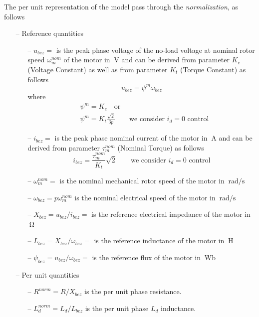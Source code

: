 \documentclass[11pt,a4paper]{article}
\numberwithin{equation}{section}
\theoremstyle{it}
\theoremstyle{definition}
\begin{document}
\begin{onehalfspace}
The per unit representation of the model pass through the \textit{normalization}, as follows
\begin{itemize}
	\item[--] Reference quantities
	\begin{itemize}
		\item[--] $u_{bez} = $ is the peak phase voltage of the no-load voltage at nominal rotor speed $\omega_m^{nom}$ of the motor in $\SI{}{\volt}$ and can be derived from parameter $K_e$ (Voltage Constant) as well as from parameter $K_t$ (Torque Constant) as follows
		\begin{equation}
			u_{bez} = \psi^m\omega_{bez} 
		\end{equation}
	where
		\begin{equation}
			\begin{aligned}
			& \psi^m = K_e\quad \text{or} \\[6pt]
			& \psi^m = K_t\frac{\sqrt{2}}{3p} \qquad\text{we consider $i_d=0$ control}
			\end{aligned}
		\end{equation}
		\item[--] $i_{bez} = $ is the peak phase nominal current of the motor in $\SI{}{\ampere}$ and can be derived from parameter $\tau_m^{nom}$ (Nominal Torque) as follows
		\begin{equation}
			i_{bez} = \frac{\tau_m^{nom}}{K_t}\sqrt{2} \qquad\text{we consider $i_d=0$ control}
		\end{equation}
		\item[--] $\omega_m^{nom} = $ is the nominal mechanical rotor speed of the motor in $\SI{}{\radian\per\second}$
		\item[--] $\omega_{bez} = p \omega_m^{nom}$ is the nominal electrical speed of the motor in $\SI{}{\radian\per\second}$
		\item[--] $X_{bez} = u_{bez}/i_{bez} = $ is the reference electrical impedance of the motor in $\SI{}{\ohm}$
		\item[--] $L_{bez} = X_{bez}/\omega_{bez} = $ is the reference inductance of the motor in $\SI{}{\henry}$	
		\item[--] $\psi_{bez} = u_{bez}/\omega_{bez} = $ is the reference flux of the motor in $\SI{}{\weber}$
	\end{itemize}
	\item[--] Per unit quantities
		\begin{itemize}
		\item[--] $R^{norm} = R/X_{bez}$ is the per unit phase resistance.
		\item[--] $L_d^{norm} = L_d/L_{bez}$ is the per unit phase $L_d$ inductance.

\end{itemize}
\end{itemize}
\end{onehalfspace}
\end{document}
